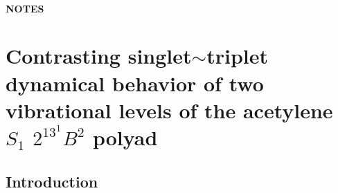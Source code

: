 \documentclass[12pt,draft]{mitthesis}
\begin{document}
\tableofcontents
\clearpage

\subsubsection*{NOTES}

\clearpage

\setcounter{chapter}{4}
\chapter{Contrasting singlet$\sim$triplet dynamical behavior of two
  vibrational levels of the acetylene $S_1$ $2^13^1B^2$ polyad }

\section{Introduction}
\end{document}
